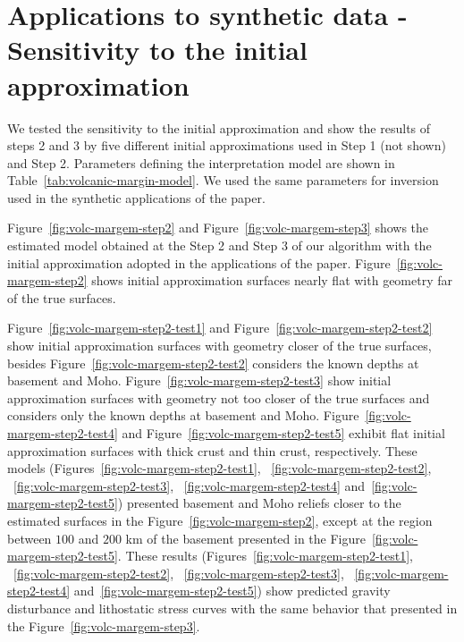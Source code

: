 \documentclass[manuscript]{geophysics}
\begin{document}
\section{Applications to synthetic data - Sensitivity to the initial approximation}

We tested the sensitivity to the initial approximation and show the results of steps 2 and 3 by five different initial approximations used in Step 1 (not shown) and Step 2. Parameters defining the interpretation model are shown in Table~\ref{tab:volcanic-margin-model}.  We used the same parameters for inversion used in the synthetic applications of the paper.

Figure~\ref{fig:volc-margem-step2} and Figure~\ref{fig:volc-margem-step3} shows the estimated model obtained at the Step 2 and Step 3 of our algorithm with the initial approximation adopted in the applications of the paper. Figure~\ref{fig:volc-margem-step2} shows initial approximation surfaces nearly flat with geometry far of the true surfaces. 

Figure~\ref{fig:volc-margem-step2-test1} and Figure~\ref{fig:volc-margem-step2-test2} show initial approximation surfaces with geometry closer of the true surfaces, besides Figure~\ref{fig:volc-margem-step2-test2} considers the known depths at basement and Moho. Figure~\ref{fig:volc-margem-step2-test3} show initial approximation surfaces with geometry not too closer of the true surfaces and considers only the known depths at basement and Moho. Figure~\ref{fig:volc-margem-step2-test4} and Figure~\ref{fig:volc-margem-step2-test5} exhibit flat initial approximation surfaces with thick crust and thin crust, respectively. These models (Figures~\ref{fig:volc-margem-step2-test1}, ~\ref{fig:volc-margem-step2-test2}, ~\ref{fig:volc-margem-step2-test3}, ~\ref{fig:volc-margem-step2-test4} and~\ref{fig:volc-margem-step2-test5}) presented basement and Moho reliefs closer to the estimated surfaces in the Figure~\ref{fig:volc-margem-step2}, except at the region between $100$ and $200$ km of the basement presented in the Figure~\ref{fig:volc-margem-step2-test5}. These results (Figures~\ref{fig:volc-margem-step2-test1}, ~\ref{fig:volc-margem-step2-test2}, ~\ref{fig:volc-margem-step2-test3}, ~\ref{fig:volc-margem-step2-test4} and~\ref{fig:volc-margem-step2-test5}) show predicted gravity disturbance and lithostatic stress curves with the same behavior that presented in the Figure~\ref{fig:volc-margem-step3}. 
\end{document}
